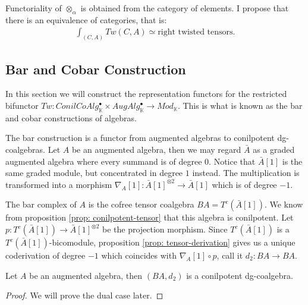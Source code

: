 \documentclass[../thesis.tex]{subfiles}
\begin{document}
            \begin{remark}
                Functoriality of $\otimes_\alpha$ is obtained from the category of elements. I propose that there is an equivalence of categories, that is:
                \begin{align*}
                    \int_{(C,A)} Tw(C,A) \simeq \text{right twisted tensors.}
                \end{align*}
            \end{remark}

        \subsection{Bar and Cobar Construction}

            In this section we will construct the representation functors for the restricted bifunctor $Tw:ConilCoAlg_\mathbb{K}^\bullet\times AugAlg_\mathbb{K}^\bullet\rightarrow Mod_\mathbb{K}$. This is what is known as the bar and cobar constructions of algebras.

            The bar construction is a functor from augmented algebras to conilpotent dg-coalgebras. Let $A$ be an augmented algebra, then we may regard $\bar{A}$ as a graded augmented algebra where every summand is of degree $0$. Notice that $\bar{A}[1]$ is the same graded module, but concentrated in degree $1$ instead. The multiplication is transformed into a morphism $\nabla_A[1]:\bar{A}[1]^{\otimes 2}\rightarrow \bar{A}[1]$ which is of degree $-1$.

            The bar complex of $A$ is the cofree tensor coalgebra $BA = T^c(\bar{A}[1])$. We know from proposition \ref{prop: conilpotent-tensor} that this algebra is conilpotent. Let $p:T^c(\bar{A}[1])\rightarrow \bar{A}[1]^{\otimes 2}$ be the projection morphism. Since $T^c(\bar{A}[1])$ is a $T^c(\bar{A}[1])$-bicomodule, proposition \ref{prop: tensor-derivation} gives us a unique coderivation of degree $-1$ which coincides with $\nabla_A[1]\circ p$, call it $d_2:BA\rightarrow BA$.
            
            \begin{proposition}
                Let $A$ be an augmented algebra, then $(BA, d_2)$ is a conilpotent dg-coalgebra.
            \end{proposition}

            \begin{proof}
                We will prove the dual case later.
            \end{proof}
\end{document}
